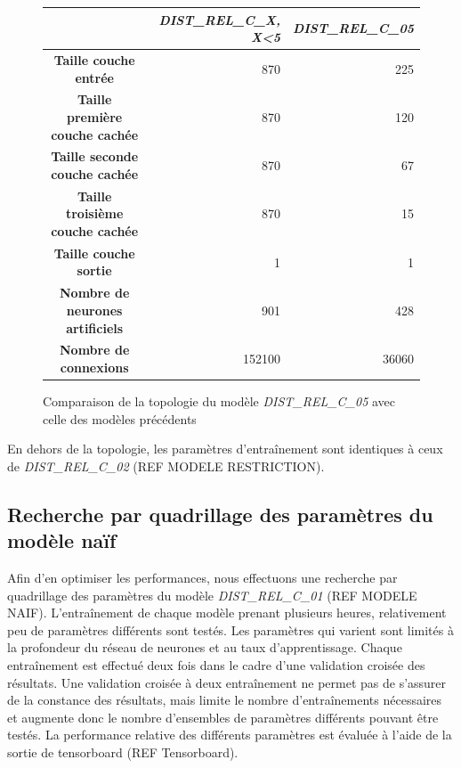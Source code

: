 \begin{figure}[!h]
	\centering
	\begin{tabular}{|c|r|r|}
		\hline
		& \textbf{\emph{DIST\_REL\_C\_X, X<5}} & \textbf{\emph{DIST\_REL\_C\_05}}\\ \hline
		\textbf{Taille couche entrée} & 870 & 225 \\ \hline
		\textbf{Taille première couche cachée} & 870 & 120\\ \hline
		\textbf{Taille seconde couche cachée} & 870 & 67\\ \hline
		\textbf{Taille troisième couche cachée} & 870 & 15\\ \hline
		\textbf{Taille couche sortie} & 1 & 1\\ \hline
		\textbf{Nombre de neurones artificiels} & 901 & 428\\ \hline
		\textbf{Nombre de connexions} & 152100 & 36060 \\ \hline
	\end{tabular}
	
	\caption{Comparaison de la topologie du modèle \emph{DIST\_REL\_C\_05} avec celle des modèles précédents}
\end{figure}

\par En dehors de la topologie, les paramètres d'entraînement sont identiques à ceux de \emph{DIST\_REL\_C\_02} (REF MODELE RESTRICTION).

\subsection{Recherche par quadrillage des paramètres du modèle naïf}

\par Afin d'en optimiser les performances, nous effectuons une recherche par quadrillage des paramètres du modèle \emph{DIST\_REL\_C\_01} (REF MODELE NAIF). L'entraînement de chaque modèle prenant plusieurs heures, relativement peu de paramètres différents sont testés. Les paramètres qui varient sont limités à la profondeur du réseau de neurones et au taux d'apprentissage. Chaque entraînement est effectué deux fois dans le cadre d'une validation croisée des résultats. Une validation croisée à deux entraînement ne permet pas de s'assurer de la constance des résultats, mais limite le nombre d'entraînements nécessaires et augmente donc le nombre d'ensembles de paramètres différents pouvant être testés. La performance relative des différents paramètres est évaluée à l'aide de la sortie de tensorboard (REF Tensorboard).\\

